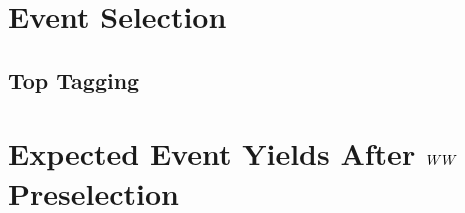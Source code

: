 \documentclass{cmspaper}
\begin{document}
\section{Event Selection}
  \label{sec:selection} 
  
\subsection{Top Tagging}
     \label{sec:sel_toptag}

\section{Expected Event Yields After $WW$ Preselection}
  \label{sec:yields}
\end{document}
